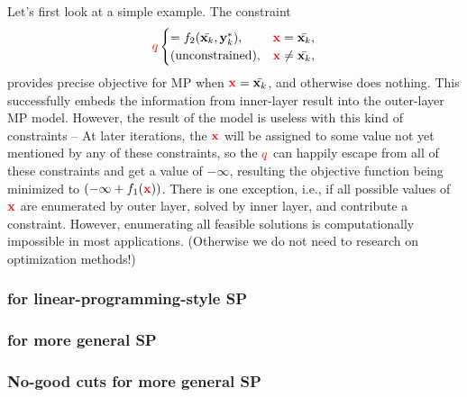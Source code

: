 \documentclass[twocolumn]{ctexart}
\begin{document}
Let's first look at a simple example.
The constraint
\begin{equation}
    \begin{aligned}
        {\color{red} q}
        \begin{cases}
            = f_2(  \bar{\mathbf{x}_k}  ,  \mathbf{y}^*_k  ),  &  \mathbf{\color{red} x} =    \bar{\mathbf{x}_k}, \\
            \text{(unconstrained)}                         ,  &  \mathbf{\color{red} x} \neq \bar{\mathbf{x}_k}, \\
        \end{cases}
    \end{aligned}
\end{equation}
provides precise objective for MP when $\mathbf{\color{red} x} = \bar{\mathbf{x}_k}$, and otherwise does nothing.
%
%
This successfully embeds the information from inner-layer result into the outer-layer MP model.
However, the result of the model is useless with this kind of constraints --
At later iterations, the $\mathbf{\color{red} x}$ will be assigned to some value not yet mentioned by any of these constraints,
so the ${\color{red} q}$ can happily escape from all of these constraints and get a value of $-\infty$,
resulting the objective function being minimized to $( - \infty + f_1(  \mathbf{\color{red} x}  ) )$.
There is one exception, i.e., if all possible values of $\mathbf{\color{red} x}$ are enumerated by outer layer, solved by inner layer, and contribute a constraint.
However, enumerating all feasible solutions is computationally impossible in most applications. (Otherwise we do not need to research on optimization methods!)


\subsubsection{for linear-programming-style SP}


\subsubsection{for more general SP}


\subsubsection{No-good cuts for more general SP}


\begin{equation}
    \begin{aligned}
    \end{aligned}
\end{equation}
\end{document}
